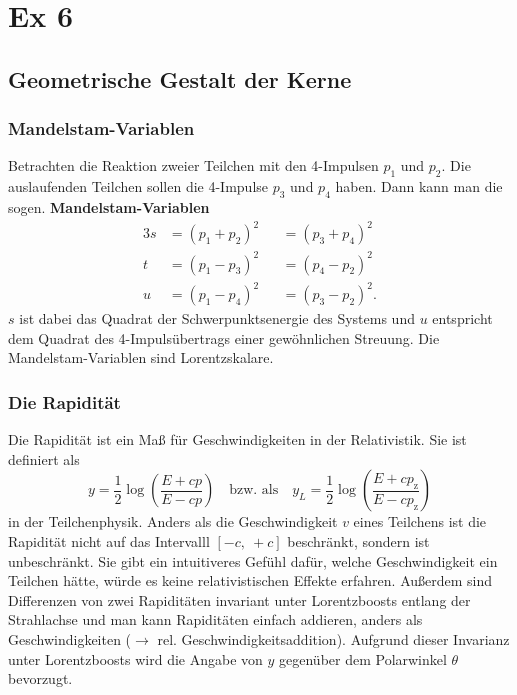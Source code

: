 \chapter{Ex 6}

\section{Geometrische Gestalt der Kerne}

\subsection{Mandelstam-Variablen}
Betrachten die Reaktion zweier Teilchen mit den 4-Impulsen $p_1$ und $p_2$. Die auslaufenden Teilchen sollen die 4-Impulse $p_3$ und $p_4$ haben.
Dann kann man die sogen. \textbf{Mandelstam-Variablen}
\begin{alignat*}{3}
	s &= \left(p_1 + p_2 \right)^2 &&= \left(p_3 + p_4 \right)^2 \\
	t &= \left(p_1 - p_3 \right)^2 &&= \left(p_4 - p_2 \right)^2 \\
	u &= \left(p_1 - p_4 \right)^2 &&= \left(p_3 - p_2 \right)^2.
\end{alignat*}
$s$ ist dabei das Quadrat der Schwerpunktsenergie des Systems und $u$ entspricht dem Quadrat des 4-Impulsübertrags einer gewöhnlichen Streuung.
Die Mandelstam-Variablen sind Lorentzskalare.

\subsection{Die Rapidität}
Die Rapidität ist ein Maß für Geschwindigkeiten in der Relativistik.
Sie ist definiert als
\begin{equation*}
	y = \frac{1}{2}\log\left(\frac{E+cp}{E-cp}\right)\quad \text{bzw. als}\quad y_L=\frac{1}{2}\log\left(\frac{E+cp_\text{z}}{E-cp_\text{z}}\right)
\end{equation*}
in der Teilchenphysik.
Anders als die Geschwindigkeit $v$ eines Teilchens ist die Rapidität nicht auf das Intervalll $[-c,\ +c]$ beschränkt, sondern ist unbeschränkt.
Sie gibt ein intuitiveres Gefühl dafür, welche Geschwindigkeit ein Teilchen hätte, würde es keine relativistischen Effekte erfahren.
Außerdem sind Differenzen von zwei Rapiditäten invariant unter Lorentzboosts entlang der Strahlachse und man kann Rapiditäten einfach addieren, anders als Geschwindigkeiten ($\rightarrow$ rel. Geschwindigkeitsaddition).
Aufgrund dieser Invarianz unter Lorentzboosts wird die Angabe von $y$ gegenüber dem Polarwinkel $\theta$ bevorzugt.

